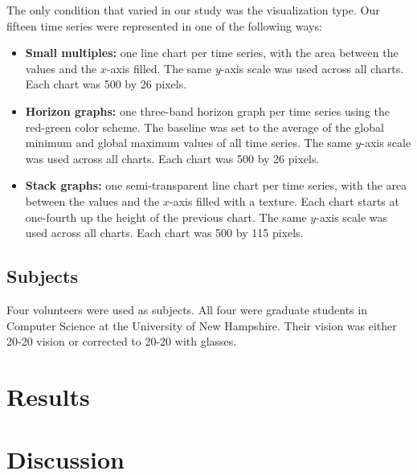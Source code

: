 \documentclass{article}
\begin{document}
The only condition that varied in our study was the visualization type.  Our fifteen time series were represented in one of the following ways:

\begin{itemize}
\item \textbf{Small multiples:} one line chart per time series, with the area between the values and the $x$-axis filled. The same $y$-axis scale was used across all charts.  Each chart was 500 by 26 pixels.
\item \textbf{Horizon graphs:} one three-band horizon graph per time series using the red-green color scheme.  The baseline was set to the average of the global minimum and global maximum values of all time series.  The same $y$-axis scale was used across all charts.  Each chart was 500 by 26 pixels.
\item \textbf{Stack graphs:}  one semi-transparent line chart per time series, with the area between the values and the $x$-axis filled with a texture. Each chart starts at one-fourth up the height of the previous chart. The same $y$-axis scale was used across all charts.  Each chart was 500 by 115 pixels.
\end{itemize}

\subsection{Subjects}

Four volunteers were used as subjects.  All four were graduate students in Computer Science at the University of New Hampshire.  Their vision was either 20-20 vision or corrected to 20-20 with glasses.

\section{Results}

\section{Discussion}




\end{document}

